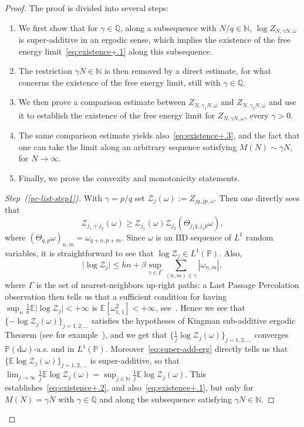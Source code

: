 \documentclass[10pt]{amsart}
\theoremstyle{definition}\newtheorem{defi}[theo]{Definition}\newtheorem{rema}[theo]{Remark}\newtheorem{exam}[theo]{Example}\newtheorem{exem}[theo]{Example}\newtheorem{nota}[theo]{Notation}
\newenvironment{step}[1]{\begin{proof}[{#1}]}{\let\qed\relax\end{proof}}
\newcommand{\gb}{\beta}
\newcommand{\go}{\omega}
\newcommand{\dd}{\mathrm{d}}
\newcommand{\cZ}{\ensuremath{\mathcal{Z}}}
\newcommand{\bbE}{\ensuremath{\mathbb{E}}}
\newcommand{\bbN}{\ensuremath{\mathbb{N}}}
\newcommand{\bbP}{\ensuremath{\mathbb{P}}}
\newcommand{\bbQ}{\ensuremath{\mathbb{Q}}}
\begin{document}
\begin{proof}
The proof is divided into several steps:
\begin{enumerate}
\item\label{pr-list-step1} We first show that for $\gamma \in \bbQ$, along a subsequence with $ N/q\in \bbN$, $\log Z_{N, \gamma N, \go}$ is super-additive in an ergodic sense, which implies the existence of the free energy limit~\eqref{eq:existence+.1} along this subsequence.
\item \label{pr-list-step2} The restriction $\gamma N\in \bbN$ is then removed by a direct estimate, for what concerns the existence of the free energy limit, still with $\gamma \in \bbQ$.
\item \label{pr-list-step3}We then prove a comparison estimate between $Z_{N, \gamma_1 N, \go}$ and $Z_{N, \gamma_2 N, \go}$ and use it to establish the existence of the free energy limit for $Z_{N, \gamma N, \go} $, every $\gamma>0$.
\item \label{pr-list-step4}The same comparison estimate yields also~\eqref{eq:existence+.3}, and the fact that one can take the limit along an arbitrary sequence satisfying $M (N) \sim \gamma N$, for $N \to \infty$.
\item \label{pr-list-step5}Finally, we prove the convexity and monotonicity statements.
\end{enumerate}
\goodbreak

\begin{step}{Step~(\ref{pr-list-step1})}
With $\gamma=p/q$ set $
\cZ_{j}(\go) := Z_{jq, jp, \go}$. Then one directly sees that
\begin{equation}\label{eq:super-add-erg}
\cZ_{j_1+j_2}(\go)\ge \cZ_{j_1}(\go) \cZ_{j_2}\left(\Theta_{j_1 q,j_1 p} \go\right),
\end{equation}
where $(\Theta_{q,p} \go)_{n,m}= \go_{q+n,p+m}$. Since $\go$ is an IID sequence of $L^1$ random variables, it is straightforward to see that $\log \cZ_{j} \in L^1(\bbP)$. Also,
\[
\lvert \log \cZ_{j} \vert \leq h n+ \gb \sup_{\gamma \in \Gamma } \sum_{(n,m)\in\gamma} |\go_{n,m}|,
\]
where $\Gamma$ is the set of nearest-neighbors up-right paths: a Last Passage Percolation observation then tells us that a sufficient condition for having $\sup_n \frac{1}{n} \bbE \lvert\log \cZ_{j} \vert <+\infty$ is $\bbE[\go_{1,1}^2]<+\infty$, see~\cite{cf:Martin02}. Hence we see that $\{ -\log \cZ_{j}(\go)\}_{j=1,2, \ldots}$ satisfies the hypotheses of Kingman sub-additive ergodic Theorem (see for example~\cite[Section~A.7]{cf:GB}), and we get that $\{\frac{1}{j}\log \cZ_{j}(\go)\}_{j=1,2,\ldots}$ converges $\bbP(\dd \go)$-a.s. and in $L^1(\bbP)$. Moreover~\eqref{eq:super-add-erg} directly tells us that $\{\bbE \log \cZ_{j}(\go)\}_{j=1,2, \ldots}$ is super-additive, so that $\lim _{j\to \infty} \frac{1}{j} \bbE \log \cZ_{j}(\go)= \sup_{j\in \bbN} \frac{1}{j} \bbE \log \cZ_{j}(\go)$. This establishes~\eqref{eq:existence+.2}, and also~\eqref{eq:existence+.1}, but only for $M(N)= \gamma N$ with $\gamma \in \bbQ$ and along the subsequence satisfying $\gamma N \in \bbN$.
\end{step}


\end{proof}
\end{document}
